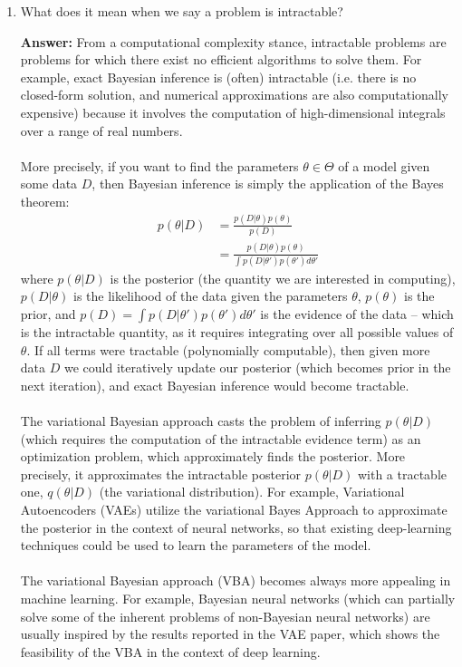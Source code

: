 \documentclass{article}
\newenvironment{QandA}{\begin{enumerate}[label=\arabic*.]}{\end{enumerate}}
\newenvironment{answer}{\par\normalfont \textbf{Answer:}}{}
\newcommand{\g}{\vert}
\begin{document}
\begin{QandA}
    \item What does it mean when we say a problem is intractable?
    \begin{answer}
        From a computational complexity stance, intractable problems are problems for which there exist no efficient algorithms to solve them. For example, exact Bayesian inference is (often) intractable (i.e. there is no closed-form solution, and numerical approximations are also computationally expensive) because it involves the computation of high-dimensional integrals over a range of real numbers.\\\\
        More precisely, if you want to find the parameters $\theta \in \Theta$ of a model given some data $D$, then Bayesian inference is simply the application of the Bayes theorem:
        \begin{align*}
            p(\theta \g D) &= \frac{p(D \g \theta) p(\theta)}{p(D)} \\
            &= \frac{p(D \g \theta) p(\theta)}{\int p(D \g \theta') p(\theta') d \theta'}
        \end{align*}
        where $p(\theta \g D)$ is the posterior (the quantity we are interested in computing), $p(D \g \theta)$ is the likelihood of the data given the parameters $\theta$, $p(\theta)$ is the prior, and $p(D) = \int p(D \g \theta') p(\theta') d \theta'$ is the evidence of the data -- which is the intractable quantity, as it requires integrating over all possible values of $\theta$. If all terms were tractable (polynomially computable), then given more data $D$ we could iteratively update our posterior (which becomes prior in the next iteration), and exact Bayesian inference would become tractable. \\\\
        The variational Bayesian approach casts the problem of inferring $p(\theta \g D)$(which requires the computation of the intractable evidence term) as an optimization problem, which approximately finds the posterior. More precisely, it approximates the intractable posterior $p(\theta \g D)$ with a tractable one, $q(\theta \g D)$ (the variational distribution). For example, Variational Autoencoders (VAEs) utilize the variational Bayes Approach to approximate the posterior in the context of neural networks, so that existing deep-learning techniques could be used to learn the parameters of the model. \\\\
        The variational Bayesian approach (VBA) becomes always more appealing in machine learning. For example, Bayesian neural networks (which can partially solve some of the inherent problems of non-Bayesian neural networks) are usually inspired by the results reported in the VAE paper, which shows the feasibility of the VBA in the context of deep learning.


\end{answer}
\end{QandA}
\end{document}
